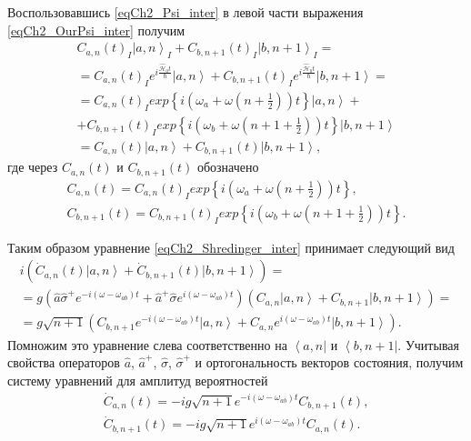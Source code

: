 Воспользовавшись \eqref{eqCh2_Psi_inter} в левой части выражения
\eqref{eqCh2_OurPsi_inter} получим 
\begin{eqnarray}
C_{a,n}\left(t\right)_I\left|a, n\right>_I +
C_{b,n+1}\left(t\right)_I\left|b, n + 1\right>_I =
\nonumber \\
= C_{a,n}\left(t\right)_I e^{i \frac{\hat{\mathcal{H}}_0
    t}{\hbar}} \left|a, n\right> +
C_{b,n+1}\left(t\right)_I e^{i \frac{\hat{\mathcal{H}}_0
    t}{\hbar}} \left|b, n + 1\right> = 
\nonumber \\
=
C_{a,n}\left(t\right)_I exp\left\{i \left(
 \omega_a +  \omega 
\left( n + \frac{1}{2}\right) 
\right) t
\right\} \left|a, n\right> +
\nonumber \\
+
C_{b,n+1}\left(t\right)_I exp\left\{i 
\left(
\omega_b +  \omega 
\left( n + 1 + \frac{1}{2}\right) 
\right)
    t \right\} \left|b, n + 1\right>
\nonumber \\
=
C_{a,n}\left(t\right) \left|a, n\right> +
C_{b,n+1}\left(t\right) \left|b, n + 1\right>,
\nonumber
\end{eqnarray}
где через $C_{a,n}\left(t\right)$ и $C_{b,n+1}\left(t\right)$
обозначено 
\begin{eqnarray}
C_{a,n}\left(t\right) = 
C_{a,n}\left(t\right)_I exp\left\{i 
\left(
\omega_a +  \omega 
\left( n + \frac{1}{2}\right) 
\right) 
    t \right\},
\nonumber \\
C_{b,n+1}\left(t\right) =
C_{b,n+1}\left(t\right)_I exp\left\{i \left(
\omega_b + \omega 
\left( n + 1 + \frac{1}{2}\right) 
\right)
    t\right\}.
\nonumber
\end{eqnarray}

Таким образом уравнение \eqref{eqCh2_Shredinger_inter} принимает
следующий вид   
\begin{eqnarray}
i \left( 
{\dot C}_{a,n}\left(t\right)\left|a, n\right> +
{\dot C}_{b,n+1}\left(t\right)\left|b, n + 1\right>
\right) =
\nonumber \\
= g \left(
\hat{a}\hat{\sigma}^{+} e^{-i \left(\omega - \omega_{ab}\right)t} +
\hat{a}^{+}\hat{\sigma} e^{i \left(\omega - \omega_{ab}\right)t}
\right) 
\left( 
C_{a,n}\left|a, n\right> +
C_{b,n+1}\left|b, n + 1\right>
\right) = 
\nonumber \\
= g \sqrt{n + 1} \left(
C_{b, n+1} e^{-i \left(\omega - \omega_{ab}\right)t} \left|a, n\right> + 
C_{a, n} e^{i \left(\omega - \omega_{ab}\right)t} \left|b, n + 1\right>
\right).
\end{eqnarray}
Помножим это уравнение слева соответственно на 
$\left<a, n\right|$ и $\left<b, n + 1\right|$.  Учитывая свойства
операторов  $\hat{a}$, $\hat{a}^{+}$,  $\hat{\sigma}$,
$\hat{\sigma}^{+}$ и ортогональность векторов состояния, получим  
систему уравнений для амплитуд вероятностей 
\begin{eqnarray}
{\dot C}_{a,n}\left(t\right) = -i g \sqrt{n + 1}
e^{-i \left(\omega - \omega_{ab}\right)t} 
C_{b, n + 1}\left(t\right),
\nonumber \\
{\dot C}_{b, n + 1}\left(t\right) = -i g \sqrt{n + 1}
e^{i \left(\omega - \omega_{ab}\right)t} 
C_{a, n}\left(t\right).
\label{eqCh2_task3}
\end{eqnarray}

